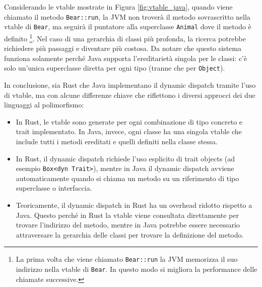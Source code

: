 Considerando le vtable mostrate in Figura \ref{fig:vtable_java}, quando viene chiamato il metodo \texttt{Bear::run}, la JVM non troverà il metodo sovrascritto nella vtable di \texttt{Bear}, ma seguirà il puntatore alla superclasse \texttt{Animal} dove il metodo è definito \footnote{La prima volta che viene chiamato \texttt{Bear::run} la JVM memorizza il suo indirizzo nella vtable di \texttt{Bear}. In questo modo si migliora la performance delle chiamate successive.}. Nel caso di una gerarchia di classi più profonda, la ricerca potrebbe richiedere più passaggi e diventare più costosa. Da notare che questo sistema funziona solamente perché Java supporta l'ereditarietà singola per le classi: c'è solo un'unica superclasse diretta per ogni tipo (tranne che per \texttt{Object}). 

In conclusione, sia Rust che Java implementano il dynamic dispatch tramite l'uso di vtable, ma con alcune differenze chiave che riflettono i diversi approcci dei due linguaggi al polimorfismo:
\begin{itemize}
    \item In Rust, le vtable sono generate per ogni combinazione di tipo concreto e trait implementato. In Java, invece, ogni classe ha una singola vtable che include tutti i metodi ereditati e quelli definiti nella classe stessa.
    \item In Rust, il dynamic dispatch richiede l'uso esplicito di trait objects (ad esempio \texttt{Box<dyn Trait>}), mentre in Java il dynamic dispatch avviene automaticamente quando si chiama un metodo su un riferimento di tipo superclasse o interfaccia.
    \item Teoricamente, il dynamic dispatch in Rust ha un overhead ridotto rispetto a Java. Questo perché in Rust la vtable viene consultata direttamente per trovare l'indirizzo del metodo, mentre in Java potrebbe essere necessario attraversare la gerarchia delle classi per trovare la definizione del metodo.     
\end{itemize}
